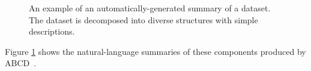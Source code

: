 \documentclass[letterpaper]{article}
\newcommand{\procedurename}{ABCD\ }
\begin{document}
\begin{figure}[h]
\centering
{}
\caption{
An example of an automatically-generated summary of a dataset.  The dataset is decomposed into diverse structures with simple descriptions.}
\label{fig:exec}
\end{figure}
Figure \ref{fig:exec} shows the natural-language summaries of these components produced by \procedurename.
%
%
\end{document}
